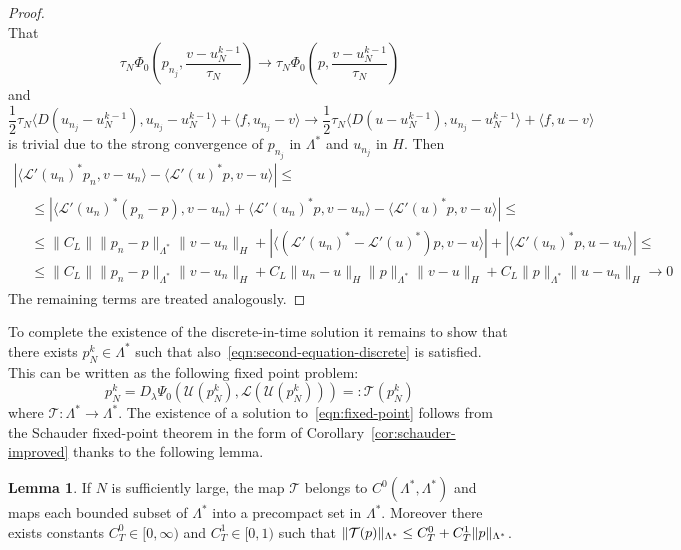\documentclass[a4paper,10pt,twoside]{amsbook}
\numberwithin{section}{chapter}
\numberwithin{equation}{chapter}
\theoremstyle{definition}
\newtheorem{lemma}[prop]{Lemma}
\DeclarePairedDelimiter{\norm}{\lVert}{\rVert}
\begin{document}
\begin{proof}
\[\]
That
\[
\tau_N\Phi_0\left(p_{n_j},\frac{v-u_N^{k-1}}{\tau_N}\right)\to\tau_N\Phi_0\left(p,\frac{v-u_N^{k-1}}{\tau_N}\right)
\]
and
\[
\frac{1}{2}\tau_N\langle D(u_{n_j}-u_N^{k-1}),u_{n_j}-u_N^{k-1}\rangle+\langle f,u_{n_j}-v\rangle\to\frac{1}{2}\tau_N\langle D(u-u_N^{k-1}),u_{n_j}-u_N^{k-1}\rangle+\langle f,u-v\rangle
\]
is trivial due to the strong convergence of $p_{n_j}$ in $\Lambda^*$ and $u_{n_j}$ in $H$. Then
\[
\begin{multlined}
\left|\langle\mathcal{L}'(u_n)^*p_n,v-u_n\rangle-\langle\mathcal{L}'(u)^*p,v-u\rangle\right|\le\\
\begin{split}
&\le\left|\langle\mathcal{L}'(u_n)^*(p_n-p),v-u_n\rangle+\langle\mathcal{L}'(u_n)^*p,v-u_n\rangle-\langle\mathcal{L}'(u)^*p,v-u\rangle\right|\le\\
&\le\|C_L\|\|p_n-p\|_{\Lambda^*}\|v-u_n\|_H+\left|\langle(\mathcal{L}'(u_n)^*-\mathcal{L}'(u)^*)p,v-u\rangle\right|+\left|\langle\mathcal{L}'(u_n)^*p,u-u_n\rangle\right|\le\\
&\le\|C_L\|\|p_n-p\|_{\Lambda^*}\|v-u_n\|_H+C_L\|u_n-u\|_H\|p\|_{\Lambda^*}\|v-u\|_H+C_L\|p\|_{\Lambda^*}\|u-u_n\|_H\to0
\end{split}
\end{multlined}
\]
The remaining terms are treated analogously.
\end{proof}
To complete the existence of the discrete-in-time solution it remains to show that there exists $p_N^k\in\Lambda^*$ such that also~\eqref{eqn:second-equation-discrete} is satisfied. This can be written as the following fixed point problem:
\begin{equation}
\label{eqn:fixed-point}
p_N^k=D_\lambda\Psi_0(\mathcal{U}(p_N^k),\mathcal{L}(\mathcal{U}(p_N^k)))=:\mathcal{T}(p_N^k)
\end{equation}
where $\mathcal{T}\colon\Lambda^*\to\Lambda^*$. The existence of a solution to~\eqref{eqn:fixed-point} follows from the Schauder fixed-point theorem in the form of Corollary~\ref{cor:schauder-improved} thanks to the following lemma.
\begin{lemma}
If $N$ is sufficiently large, the map $\mathcal{T}$ belongs to $C^0(\Lambda^*,\Lambda^*)$ and maps each bounded subset of $\Lambda^*$ into a precompact set in $\Lambda^*$. Moreover there exists constants $C_T^0\in[0,\infty)$ and $C_T^1\in[0,1)$ such that $\norm{\mathcal{T}(p)}_{\Lambda^*}\le C_T^0+C_T^1\norm{p}_{\Lambda^*}$.
\end{lemma}
\end{document}
